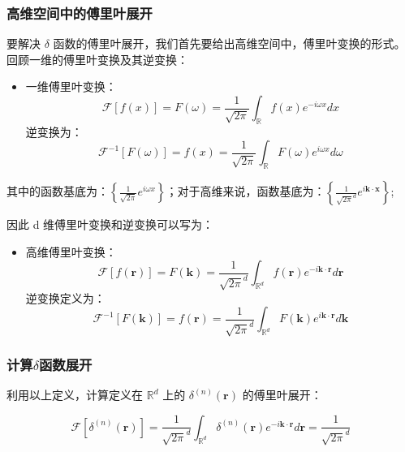 \documentclass[lang=cn,10pt,newtx,bibend=biber,device=pad]{elegantbook}
\begin{document}
\subsubsection{高维空间中的傅里叶展开}

要解决 $\delta$ 函数的傅里叶展开，我们首先要给出高维空间中，傅里叶变换的形式。回顾一维的傅里叶变换及其逆变换：

\begin{itemize}
    \item 一维傅里叶变换：
    \begin{equation}
    \mathcal{F}[f(x)]=F(\omega)=\frac{1}{\sqrt{2\pi}}\int_{\mathbb{R}}f(x)e^{-i\omega x}dx
    \end{equation}
    逆变换为：
    \begin{equation}
    \mathcal{F}^{-1}[F(\omega)]=f(x)=\frac{1}{\sqrt{2\pi}}\int_{\mathbb{R}}F(\omega)e^{i\omega x}d\omega
    \end{equation}
\end{itemize}

其中的函数基底为：$\left\{\frac{1}{\sqrt{2\pi}}e^{i\omega x}\right\}$；对于高维来说，函数基底为：$\left\{\frac{1}{\sqrt{2\pi}^{d}}e^{i\mathbf{k}\cdot\mathbf{x}}\right\}$;

因此 d 维傅里叶变换和逆变换可以写为：

\begin{itemize}
    \item 高维傅里叶变换：
    \begin{equation}
    \mathcal{F}[f(\mathbf{r})] = F(\mathbf{k}) =\frac{1}{\sqrt{2\pi}^{d}} \int_{\mathbb{R}^d} f(\mathbf{r}) e^{-i \mathbf{k} \cdot \mathbf{r}} d\mathbf{r}
    \end{equation}
    逆变换定义为：
    \begin{equation}
    \mathcal{F}^{-1}[F(\mathbf{k})] = f(\mathbf{r}) =\frac{1}{\sqrt{2\pi}^{d}} \int_{\mathbb{R}^d} F(\mathbf{k}) e^{i \mathbf{k} \cdot \mathbf{r}} d\mathbf{k}
    \end{equation}
\end{itemize}

\subsubsection{计算$\delta$函数展开}

利用以上定义，计算定义在 $\mathbb{R}^d$ 上的 $\delta^{(n)}(\mathbf{r})$ 的傅里叶展开：

\begin{equation}
\mathcal{F}[\delta^{(n)}(\mathbf{r})]  =\frac{1}{\sqrt{2\pi}^{d}} \int_{\mathbb{R}^d} \delta^{(n)}(\mathbf{r}) e^{-i \mathbf{k} \cdot \mathbf{r}} d\mathbf{r} = \frac{1}{\sqrt{2\pi}^{d}}
\end{equation}
\end{document}
